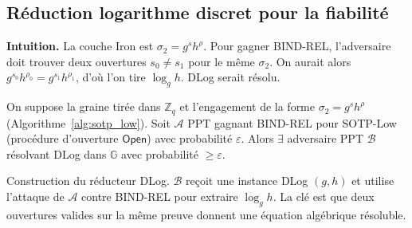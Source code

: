 \begin{sloppypar}
\subsection{R\'eduction logarithme discret pour la fiabilit\'e}

\noindent\textbf{Intuition.} La couche Iron est
$\sigma_2 = g^s h^\rho$. Pour gagner BIND-REL, l'adversaire doit trouver
deux ouvertures $s_0 \neq s_1$ pour le m\^eme $\sigma_2$. On aurait alors
$g^{s_0}h^{\rho_0} = g^{s_1}h^{\rho_1}$, d'o\`u l'on tire
$\log_g h$. DLog serait r\'esolu.

\begin{theorem}\label{thm:ann_sotp_low_rel}
On suppose la graine tir\'ee dans $\mathbb{Z}_q$ et l'engagement de la forme
$\sigma_2 = g^{s}h^{\rho}$ (Algorithme~\ref{alg:sotp_low}). Soit $\mathcal{A}$ PPT
gagnant BIND-REL pour SOTP-Low (proc\'edure d'ouverture $\mathsf{Open}$) avec
probabilit\'e $\varepsilon$. Alors $\exists$ adversaire PPT $\mathcal{B}$ r\'esolvant
DLog dans $\mathbb{G}$ avec probabilit\'e $\geq \varepsilon$.
\end{theorem}

\begin{Preuve}

\begin{cmtEtape}{Construction du r\'educteur DLog.}
$\mathcal{B}$ re\c{c}oit une instance DLog $(g, h)$ et utilise l'attaque
de $\mathcal{A}$ contre BIND-REL pour extraire $\log_g h$. La cl\'e est
que deux ouvertures valides sur la m\^eme preuve donnent une \'equation
alg\'ebrique r\'esoluble.
\end{cmtEtape}


\end{Preuve}
\end{sloppypar}
